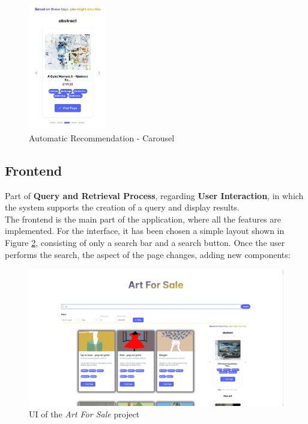 \documentclass[12pt]{spieman}  %
\begin{document}
\begin{spacing}{1}
    \begin{figure}[H]
        \centering
        \caption{Automatic Recommendation - Carousel}
        \label{fig:carousel}
        \includegraphics[width=0.3\textwidth, trim={0cm 0cm 0cm 0cm}]{figures/recommendation-carousel.jpeg}
    \end{figure}

    \subsection{Frontend}\label{sec:frontend}
    Part of \textbf{Query and Retrieval Process},
    regarding \textbf{User Interaction}, in which the system supports the creation of a query and display results.\\
    The frontend is the main part of the application, where all the features are implemented.
    For the interface, it has been chosen a simple layout shown in Figure \ref{fig:ui},
    consisting of only a search bar and a search button.
    Once the user performs the search, the aspect of the page changes, adding new components:

    \begin{figure}[H]
        \centering
        \caption{UI of the \textit{Art For Sale} project}
        \label{fig:ui}
        \includegraphics[width=\textwidth, trim={7cm 0cm 7cm 2cm}, clip]{figures/ui.jpeg}
    \end{figure}


\end{spacing}
\end{document}
